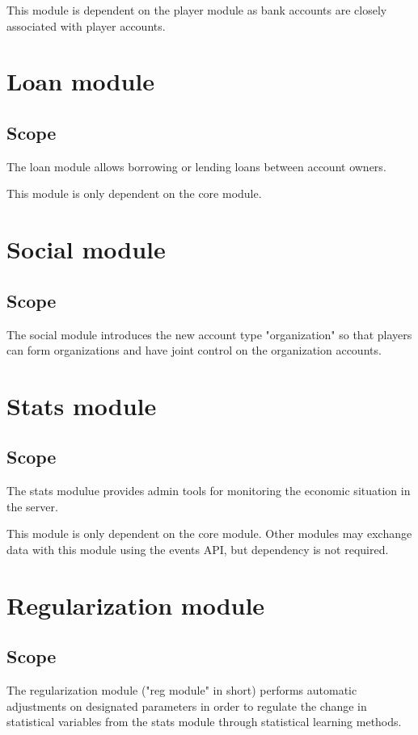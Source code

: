 \documentclass{report}
\begin{document}
			This module is dependent on the player module as bank accounts are closely associated with player accounts.

	\part{Loan module}
		\chapter{Scope}
			The loan module allows borrowing or lending loans between account owners.

			This module is only dependent on the core module.

	\part{Social module}
		\chapter{Scope}
			The social module introduces the new account type "organization" so that players can form organizations
			and have joint control on the organization accounts.

	\part{Stats module}
		\chapter{Scope}
			The stats modulue provides admin tools for monitoring the economic situation in the server.

			This module is only dependent on the core module.
			Other modules may exchange data with this module using the events API,
			but dependency is not required.

	\part{Regularization module}
		\chapter{Scope}
			The regularization module ("reg module" in short) performs automatic adjustments on designated parameters
			in order to regulate the change in statistical variables from the stats module through statistical learning methods.
\end{document}
